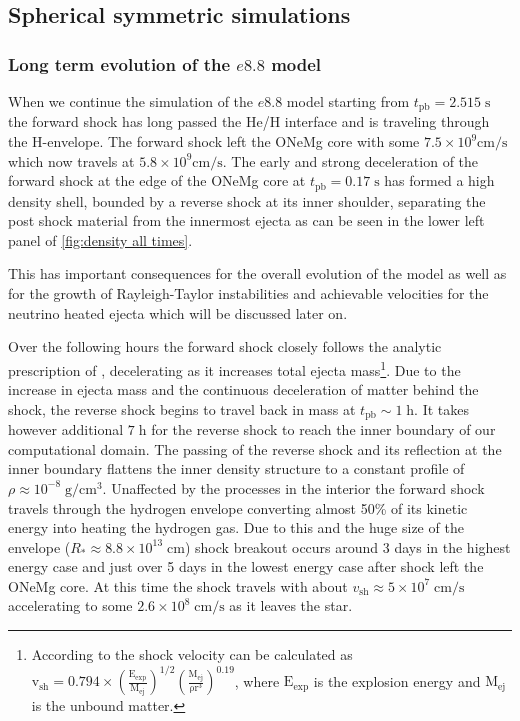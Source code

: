 \documentclass[fleqn,usenatbib]{mnras}
\newcommand{\tpb}{\ensuremath{t_\mathrm{pb}}}
\begin{document}
\subsection{Spherical symmetric simulations}
\subsubsection{Long term evolution of the $e8.8$ model}

When we continue the simulation of the $e8.8$ model starting from $t_{\mathrm{pb}}=2.515\;\mathrm{s}$ the forward shock has long passed the He/H interface and is traveling through the H-envelope. The forward shock left the ONeMg core with some $7.5\times 10^{9}\mathrm{cm/s}$ which now travels at $5.8\times 10^{9}\mathrm{cm/s}$. The early and strong deceleration of the forward shock at the edge of the ONeMg core at $t_{\mathrm{pb}}=0.17\;\mathrm{s}$ has formed a high density shell, bounded by a reverse shock at its inner shoulder, separating the post shock material from the innermost ejecta as can be seen in the lower left panel of \autoref{fig:density all times}.

This has important consequences for the overall evolution of the model as well as for the growth of Rayleigh-Taylor instabilities and achievable velocities for the neutrino heated ejecta which will be discussed later on.

Over the following hours the forward shock closely follows the analytic prescription of \citet{Matzner1998}, decelerating as it increases total ejecta mass\footnote{According to \citet{Matzner1998} the shock velocity can be calculated as $\mathrm{v_{sh}=0.794\times(\frac{E_{exp}}{M_{ej}})^{1/2}(\frac{M_{ej}}{\rho r^3})^{0.19}}$, where $\mathrm{E_{exp}}$ is the explosion energy and $\mathrm{M_{ej}}$ is the unbound matter.}. Due to the increase in ejecta mass and the continuous deceleration of matter behind the shock, the reverse shock begins to travel back in mass at  $\tpb\sim 1\;\mathrm{h}$. It takes however additional $7\;\mathrm{h}$ for the reverse shock to reach the inner boundary of our computational domain. 
The passing of the reverse shock and its reflection at the inner boundary flattens the inner density structure to a constant profile of $\rho\approx 10^{-8}\;\mathrm{g/cm^3}$.
Unaffected by the processes in the interior the forward shock travels through the hydrogen envelope converting almost 50\% of its kinetic energy into heating the hydrogen gas. Due to this and the huge size of the envelope ($R_{*}\approx8.8\times10^{13}\;\mathrm{cm}$) shock breakout occurs around 3 days in the highest energy case and just over 5 days in the lowest energy case after shock left the ONeMg core. At this time the shock travels with about $v_{\mathrm{sh}}\approx 5\times 10^{7}\; \mathrm{cm/s}$ accelerating to some $2.6\times 10^{8}\; \mathrm{cm/s}$ as it leaves the star.
\end{document}
